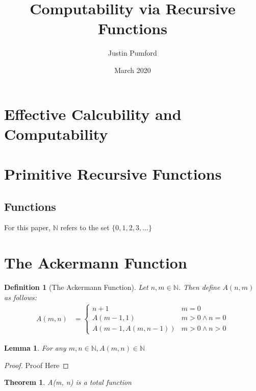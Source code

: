 \documentclass[12pt, letterpaper]{article}
\title{Computability via Recursive Functions}
\author{Justin Pumford  }
\date{March 2020}
\newtheorem{theorem}{Theorem}
\newtheorem{lemma}{Lemma}
\newtheorem*{definition}{Definition}
\begin{document}
  \maketitle

  \section{Effective Calcubility and Computability}

  \section{Primitive Recursive Functions}
    \subsection{Functions}
      For this paper, $\mathbb{N}$ refers to the set $\{0, 1, 2, 3, ...\}$


  \section{The Ackermann Function}
    \begin{definition}[The Ackermann Function]
      Let $n, m \in \mathbb{N}$. Then define $A(n, m)$ as follows:
      \begin{equation*}
        \begin{aligned}
          A(m, n) &=
          \begin{cases}
            n + 1                   & m = 0 \\
            A(m - 1, 1)             & m > 0 \wedge n = 0 \\
            A(m - 1, A(m, n - 1))   & m > 0 \wedge n > 0
          \end{cases}
        \end{aligned}
      \end{equation*}
    \end{definition}

    \begin{lemma}
      \label{inn}
      For any $m, n \in \mathbb{N}, A(m, n) \in \mathbb{N}$
    \end{lemma}
    \begin{proof}
      Proof Here
    \end{proof}

    \begin{theorem}
      A(m, n) is a total function
    \end{theorem}
\end{document}
